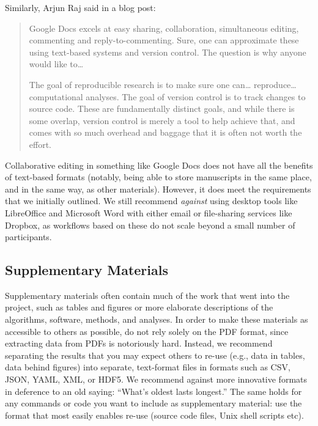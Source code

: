 \documentclass[10pt,letterpaper]{article}
\begin{document}
Similarly, Arjun Raj \cite{raj2016} said in a blog post:

\begin{quote}

  Google Docs excels at easy sharing, collaboration, simultaneous
  editing, commenting and reply-to-commenting. Sure, one can
  approximate these using text-based systems and version control. The
  question is why anyone would like to{\ldots}

  The goal of reproducible research is to make sure one can{\dots}
  reproduce{\ldots} computational analyses. The goal of version
  control is to track changes to source code. These are fundamentally
  distinct goals, and while there is some overlap, version control is
  merely a tool to help achieve that, and comes with so much overhead
  and baggage that it is often not worth the effort.

\end{quote}

Collaborative editing in something like Google Docs does not have all
the benefits of text-based formats (notably, being able to store
manuscripts in the same place, and in the same way, as other
materials).  However, it does meet the requirements that we initially
outlined.  We still recommend \emph{against} using desktop tools like
LibreOffice and Microsoft Word with either email or
file-sharing services like Dropbox, as workflows based on these do not
scale beyond a small number of participants.

\subsection*{Supplementary Materials}

Supplementary materials often contain much of the work that went into
the project, such as tables and figures or more elaborate descriptions
of the algorithms, software, methods, and analyses. In order to make
these materials as accessible to others as possible, do not rely
solely on the PDF format, since extracting data from PDFs is
notoriously hard.  Instead, we recommend separating the results that
you may expect others to re-use (e.g., data in tables, data behind
figures) into separate, text-format files in formats such as CSV,
JSON, YAML, XML, or HDF5. We recommend against more innovative
formats in deference to an old saying: ``What's oldest lasts
longest.'' The same holds for any commands or code you want to
include as supplementary material: use the format that most easily
enables re-use (source code files, Unix shell scripts etc).
\end{document}
